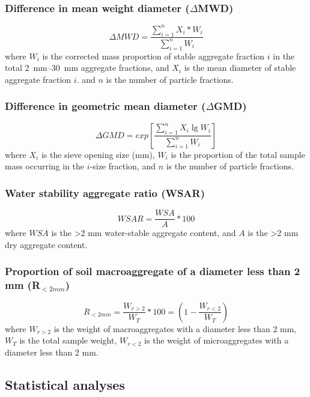 \subsubsection{Difference in mean weight diameter ($\Delta$MWD)}

    $$\Delta MWD = \frac{\sum_{i=1}^{n} X_i*W_i}{\sum_{i=1}^{n} W_i}$$
    where $W_i$ is the corrected mass proportion of stable aggregate fraction $i$ in the total \SIrange[range-phrase=--,range-units=single]{2}{30}{\milli\meter} aggregate fractions, and $X_i$ is the mean diameter of stable aggregate fraction $i$. and $n$ is the number of particle fractions.

\subsubsection{Difference in geometric mean diameter ($\Delta$GMD)}
    $$\Delta GMD = exp \left[\frac{\sum_{i=1}^{n} X_i\lg W_i}{\sum_{i=1}^{n} W_i}\right]$$
    where $X_i$ is the sieve opening size (mm), $W_i$ is the proportion of the total sample mass occurring in the $i$-size fraction, and $n$ is the number of particle fractions.

\subsubsection{Water stability aggregate ratio (WSAR)}

    $$WSAR = \frac{WSA}{A}*100$$
    where $WSA$ is the >2 mm water-stable aggregate content, and  $A$ is the >2 mm dry aggregate content.

\subsubsection{Proportion of soil macroaggregate of a diameter less than 2 mm (R$_{<2mm}$)}
    $$R_{<2mm}=\frac{W_{r>2}}{W_T}*100 = \left(1-\frac{W_{r<2}}{W_T}\right)$$
    where $W_{r>2}$ is the weight of macroaggregates with a diameter less than 2 mm, $W_T$ is the total sample weight, $W_{r<2}$ is the weight of microaggregates with a diameter less than 2 mm.
    
\subsection{Statistical analyses}

